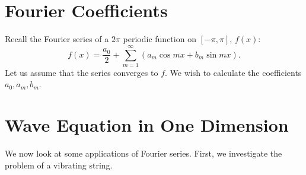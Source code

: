 \documentclass{amsart}
\begin{document}
  \section{Fourier Coefficients}

  Recall the Fourier series of a $2\pi$ periodic function on $[-\pi, \pi]$, $f(x)$:
  \begin{equation}
    f(x) = \frac{a_0}{2} + \sum_{m=1}^{\infty} (a_m \cos mx + b_m \sin mx).
  \end{equation}
  Let us assume that the series converges to $f$. We wish to calculate the coefficients $a_0, a_m, b_m$.


  \section{Wave Equation in One Dimension}
  
  We now look at some applications of Fourier series. First, we investigate the problem of a vibrating string.
\end{document}
